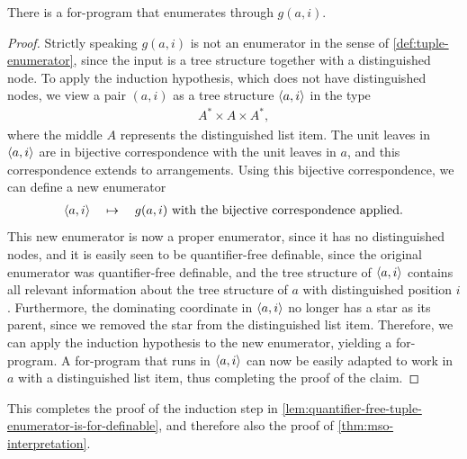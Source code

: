 \begin{claim}
    There is a for-program that enumerates through $g(a,i)$.
\end{claim}
\begin{proof}
Strictly speaking $g(a,i)$ is not an enumerator in the sense of \cref{def:tuple-enumerator}, since the input is a tree structure together with  a   distinguished node.  To apply the induction hypothesis, which does not have distinguished nodes, we view a pair $(a,i)$ as a tree structure $\langle a,i \rangle$ in the type 
\begin{align*}
A^* \times A \times A^*,
\end{align*}
where the middle $A$ represents the distinguished list item. 
The unit leaves  in $\langle a,i \rangle$ are in bijective correspondence with the unit leaves in $a$, and this correspondence extends to arrangements. Using this bijective correspondence, we can define a new enumerator
\begin{align*}
\langle a,i \rangle \quad \mapsto \quad \text{$g(a,i)$ with the bijective correspondence applied}.
\end{align*}
This new enumerator is now a proper enumerator, since it has no distinguished nodes, and it is easily seen to be quantifier-free definable, since the original enumerator was quantifier-free definable, and the  tree structure of $\langle a,i \rangle$ contains all relevant information about  the  tree structure of $a$ with distinguished position $i$.  Furthermore, the dominating coordinate in $\langle a,i \rangle$ no longer has a star as its parent, since we removed the star from the distinguished list item. Therefore, we can apply the induction hypothesis to the new enumerator, yielding a for-program. A for-program that runs in $\langle a,i \rangle$ can now be easily adapted to work in $a$ with a distinguished list item, thus completing the proof of the claim.
\end{proof}

This completes the proof of the induction step in \cref{lem:quantifier-free-tuple-enumerator-is-for-definable}, and therefore also the  proof of \cref{thm:mso-interpretation}.

\exerciseheader



